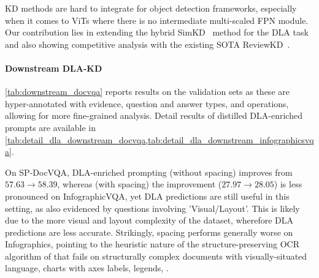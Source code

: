 \documentclass[runningheads]{llncs}
\begin{document}
KD methods are hard to integrate for object detection frameworks, especially when it comes to ViTs where there is no intermediate multi-scaled FPN module.
Our contribution lies in extending the hybrid SimKD~\cite{SimKD} method for the DLA task and also showing competitive analysis with the existing SOTA ReviewKD~\cite{chen2021distilling}.



\paragraph{Downstream DLA-KD} \cref{tab:downstream_docvqa} reports results on the validation sets as these are hyper-annotated with evidence, question and answer types, and operations, allowing for more fine-grained analysis.
Detail results of distilled DLA-enriched prompts are available in \cref{tab:detail_dla_downstream_docvqa,tab:detail_dla_downstream_infographicsvqa}.

On SP-DocVQA, DLA-enriched prompting (without spacing) improves from $57.63 \to 58.39$, whereas (with spacing) the improvement ($27.97 \to 28.05$) is less pronounced on InfographicVQA, yet  DLA predictions are still useful in this setting, as also evidenced by questions involving 'Visual/Layout'. This is likely due to the more visual and layout complexity of the dataset, wherefore DLA predictions are less accurate. Strikingly, spacing performs generally worse on Infographics, pointing to the heuristic nature of the structure-preserving OCR algorithm of \cite{wang2023layout} that fails on structurally complex documents with visually-situated language, charts with axes labels, legends, \etc.
\end{document}
